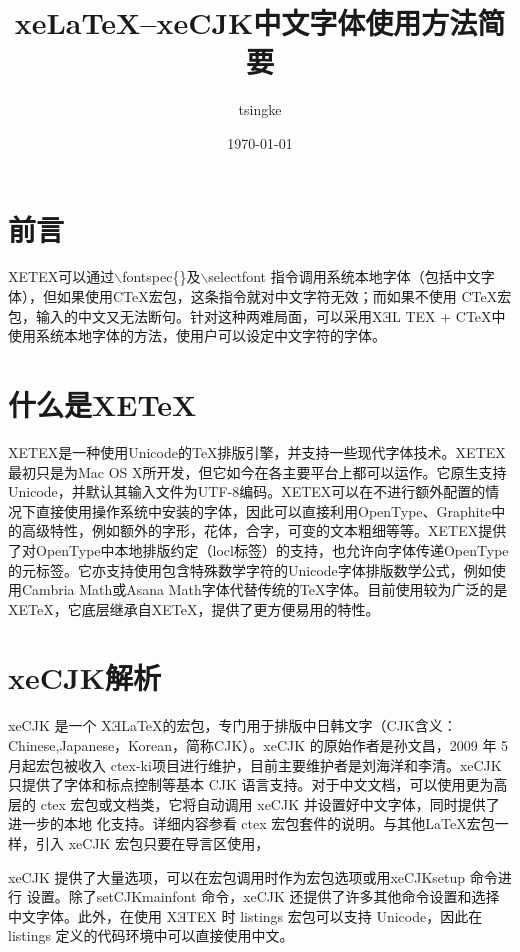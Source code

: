 \documentclass[10pt,a4paper,openany]{article}
\title{\hei xeLaTeX--xeCJK中文字体使用方法简要}
\author{tsingke}
\date{\today}
\begin{document}
	\maketitle
	
	\section{前言}
	
	 XETEX可以通过$ \backslash $fontspec\{\}及$ \backslash $selectfont 指令调用系统本地字体（包括中文字体），但如果使用CTeX宏包，这条指令就对中文字符无效；而如果不使用 CTeX宏包，输入的中文又无法断句。针对这种两难局面，可以采用XƎL TEX + CTeX中使用系统本地字体的方法，使用户可以设定中文字符的字体。
	\section{什么是XE\TeX}
	XETEX是一种使用Unicode的TeX排版引擎，并支持一些现代字体技术。XETEX最初只是为Mac OS X所开发，但它如今在各主要平台上都可以运作。它原生支持Unicode，并默认其输入文件为UTF-8编码。XETEX可以在不进行额外配置的情况下直接使用操作系统中安装的字体，因此可以直接利用OpenType、Graphite中的高级特性，例如额外的字形，花体，合字，可变的文本粗细等等。XETEX提供了对OpenType中本地排版约定（locl标签）的支持，也允许向字体传递OpenType的元标签。它亦支持使用包含特殊数学字符的Unicode字体排版数学公式，例如使用Cambria Math或Asana Math字体代替传统的TeX字体。目前使用较为广泛的是XE\TeX，它底层继承自XE\TeX，提供了更方便易用的特性。
	
	\section{xeCJK解析}
	xeCJK 是一个 XƎ\LaTeX 的宏包，专门用于排版中日韩文字（CJK含义：Chinese,Japanese，Korean，简称CJK）。xeCJK 的原始作者是孙文昌，2009 年 5 月起宏包被收入 ctex-ki项目进行维护，目前主要维护者是刘海洋和李清。xeCJK 只提供了字体和标点控制等基本 CJK 语言支持。对于中文文档，可以使用更为高层的 ctex 宏包或文档类，它将自动调用 xeCJK 并设置好中文字体，同时提供了进一步的本地 化支持。详细内容参看 ctex 宏包套件的说明。与其他\LaTeX 宏包一样，引入 xeCJK 宏包只要在导言区使用，
	
	 xeCJK 提供了大量选项，可以在宏包调用时作为宏包选项或用xeCJKsetup 命令进行 设置。除了setCJKmainfont 命令，xeCJK 还提供了许多其他命令设置和选择中文字体。此外，在使用 XƎTEX 时 listings 宏包可以支持 Unicode，因此在 listings 定义的代码环境中可以直接使用中文。
	
\end{document}
